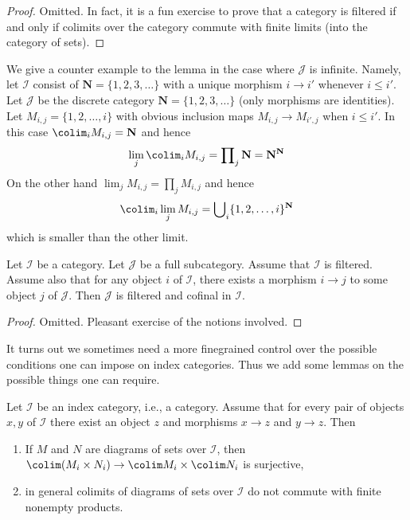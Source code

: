 \begin{proof}
Omitted. In fact, it is a fun exercise to prove that a category is
filtered if and only if colimits over the category commute with finite
limits (into the category of sets).
\end{proof}

\noindent
We give a counter example to the lemma in
the case where $\mathcal{J}$ is infinite. Namely, let
$\mathcal{I}$ consist of $\mathbf{N} = \{1, 2, 3, \ldots\}$
with a unique morphism $i \to i'$ whenever $i \leq i'$.
Let $\mathcal{J}$ be the discrete category
$\mathbf{N} = \{1, 2, 3, \ldots\}$ (only morphisms are identities).
Let $M_{i, j} = \{1, 2, \ldots, i\}$ with obvious inclusion maps
$M_{i, j} \to M_{i', j}$ when $i \leq i'$. In this case
$\colim_i M_{i, j} = \mathbf{N}$ and hence
$$
\lim_j \colim_i M_{i, j}
=
\prod\nolimits_j \mathbf{N}
=
\mathbf{N}^\mathbf{N}
$$
On the other hand $\lim_j M_{i, j} = \prod\nolimits_j M_{i, j}$ and
hence
$$
\colim_i \lim_j M_{i, j}
=
\bigcup\nolimits_i \{1, 2, \ldots, i\}^{\mathbf{N}}
$$
which is smaller than the other limit.

\begin{lemma}
\label{lemma-cofinal-in-filtered}
Let $\mathcal{I}$ be a category. Let $\mathcal{J}$ be a full subcategory.
Assume that $\mathcal{I}$ is filtered. Assume also that for any object
$i$ of $\mathcal{I}$, there exists a morphism $i \to j$
to some object $j$ of $\mathcal{J}$. Then $\mathcal{J}$
is filtered and cofinal in $\mathcal{I}$.
\end{lemma}

\begin{proof}
Omitted. Pleasant exercise of the notions involved.
\end{proof}

\noindent
It turns out we sometimes need a more finegrained control over the
possible conditions one can impose on index categories. Thus we add
some lemmas on the possible things one can require.

\begin{lemma}
\label{lemma-preserve-products}
Let $\mathcal{I}$ be an index category, i.e., a category. Assume
that for every pair of objects $x, y$ of $\mathcal{I}$
there exist an object $z$ and morphisms $x \to z$ and $y \to z$.
Then
\begin{enumerate}
\item If $M$ and $N$ are diagrams of sets over $\mathcal{I}$,
then $\colim (M_i \times N_i) \to \colim M_i \times \colim N_i$
is surjective,
\item in general colimits of diagrams of sets over $\mathcal{I}$
do not commute with finite nonempty products.
\end{enumerate}
\end{lemma}

